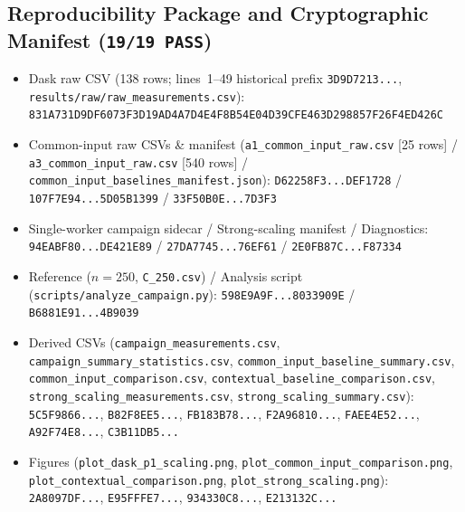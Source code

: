 \documentclass[11pt,a4paper]{article}
\begin{document}
\subsection{Reproducibility Package and Cryptographic Manifest (\texorpdfstring{\texttt{19/19 PASS}}{19/19 PASS})}
{\footnotesize\raggedright
\begin{itemize}[noitemsep, topsep=2pt]
    \item Dask raw CSV (138 rows; lines~1--49 historical prefix \texttt{3D9D7213...}, \nolinkurl{results/raw/raw_measurements.csv}): \texttt{831A731D9DF6073F3D19AD4A7D4E4F8B54E04D39CFE463D298857F26F4ED426C}
    \item Common-input raw CSVs \& manifest (\nolinkurl{a1_common_input_raw.csv} [25 rows] / \nolinkurl{a3_common_input_raw.csv} [540 rows] / \nolinkurl{common_input_baselines_manifest.json}): \texttt{D62258F3...DEF1728} / \texttt{107F7E94...5D05B1399} / \texttt{33F50B0E...7D3F3}
    \item Single-worker campaign sidecar / Strong-scaling manifest / Diagnostics: \texttt{94EABF80...DE421E89} / \texttt{27DA7745...76EF61} / \texttt{2E0FB87C...F87334}
    \item Reference ($n=250$, \nolinkurl{C_250.csv}) / Analysis script (\nolinkurl{scripts/analyze_campaign.py}): \texttt{598E9A9F...8033909E} / \texttt{B6881E91...4B9039}
    \item Derived CSVs (\nolinkurl{campaign_measurements.csv}, \nolinkurl{campaign_summary_statistics.csv}, \nolinkurl{common_input_baseline_summary.csv}, \nolinkurl{common_input_comparison.csv}, \nolinkurl{contextual_baseline_comparison.csv}, \nolinkurl{strong_scaling_measurements.csv}, \nolinkurl{strong_scaling_summary.csv}): \texttt{5C5F9866...}, \texttt{B82F8EE5...}, \texttt{FB183B78...}, \texttt{F2A96810...}, \texttt{FAEE4E52...}, \texttt{A92F74E8...}, \texttt{C3B11DB5...}
    \item Figures (\nolinkurl{plot_dask_p1_scaling.png}, \nolinkurl{plot_common_input_comparison.png}, \nolinkurl{plot_contextual_comparison.png}, \nolinkurl{plot_strong_scaling.png}): \texttt{2A8097DF...}, \texttt{E95FFFE7...}, \texttt{934330C8...}, \texttt{E213132C...}
\end{itemize}
}
\end{document}
